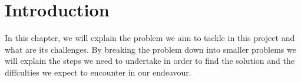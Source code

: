 \chapter{Introduction}\label{Introduction}
\ifpdf
    \graphicspath{{Introduction/IntroductionFigs/PNG/}{Introduction/IntroductionFigs/PDF/}{Introduction/IntroductionFigs/}}
\else
    \graphicspath{{Introduction/IntroductionFigs/EPS/}{Introduction/IntroductionFigs/}}
\fi

In this chapter, we will explain the problem we aim to tackle in this project and what are its challenges. By breaking
the problem down into smaller problems we will explain the steps we need to undertake in order to find the solution
and the diffculties we expect to encounter in our endeavour.


